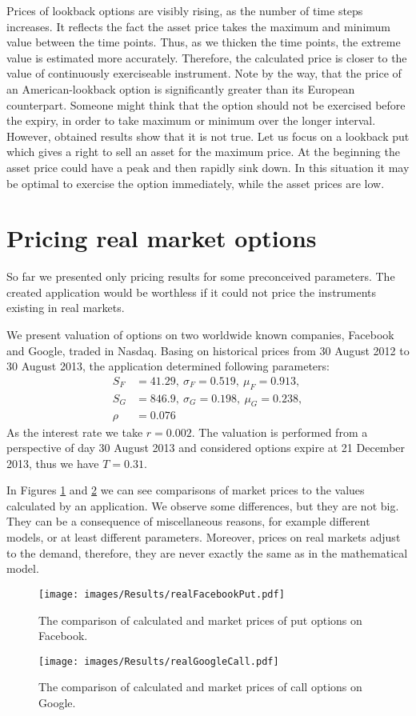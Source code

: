 \documentclass[a4paper,11pt, twoside]{book}
\theoremstyle{definition}
\theoremstyle{remark}
\newcounter{example}[chapter]
\begin{document}
Prices of lookback options are visibly rising, as the number of time steps increases. It reflects the fact the asset price takes the maximum and minimum value between the time points. Thus, as we thicken the time points, the extreme value is estimated more accurately. Therefore, the calculated price is closer to the value of continuously exerciseable instrument. Note by the way, that the price of an American-lookback option is significantly greater than its European counterpart. Someone might think that the option should not be exercised before the expiry, in order to take maximum or minimum over the longer interval. However, obtained results show that it is not true. Let us focus on a lookback put which gives a right to sell an asset for the maximum price. At the beginning the asset price could have a peak and then rapidly sink down. In this situation it may be optimal to exercise the option immediately, while the asset prices are low.

\section{Pricing real market options}
\label{sec:pricingReal}
So far we presented only pricing results for some preconceived parameters. The created application would be worthless if it could not price the instruments existing in real markets.

We present valuation of options on two worldwide known companies, Facebook and Google, traded in Nasdaq. Basing on historical prices from 30 August 2012 to 30 August 2013, the application determined following parameters:
\begin{align*}
S_F &= 41.29,\ \sigma_F = 0.519,\ \mu_F = 0.913,\\
 S_G &= 846.9,\ \sigma_G = 0.198,\ \mu_G =0.238,\\
 \rho &= 0.076 
\end{align*}
As the interest rate we take $r = 0.002$. The valuation is performed from a perspective of day 30 August 2013 and considered options expire at 21 December 2013, thus we have $T = 0.31$. 

In Figures \ref{fig:results:realFacebook} and \ref{fig:results:realGoogle} we can see comparisons of market prices to the values calculated by an application. We observe some differences, but they are not big. They can be a consequence of miscellaneous reasons, for example different models, or at least different parameters. Moreover, prices on real markets adjust to the demand, therefore, they are never exactly the same as in the mathematical model.
\begin{figure}[!htb]
\centering
 \texttt{[image: images/Results/realFacebookPut.pdf]}
\caption{The comparison of calculated and market prices of put options on Facebook.}
\label{fig:results:realFacebook}
\end{figure}
\begin{figure}[!htb]
\centering
 \texttt{[image: images/Results/realGoogleCall.pdf]}
\caption{The comparison of calculated and market prices of call options on Google.}
\label{fig:results:realGoogle}
\end{figure}
\end{document}
